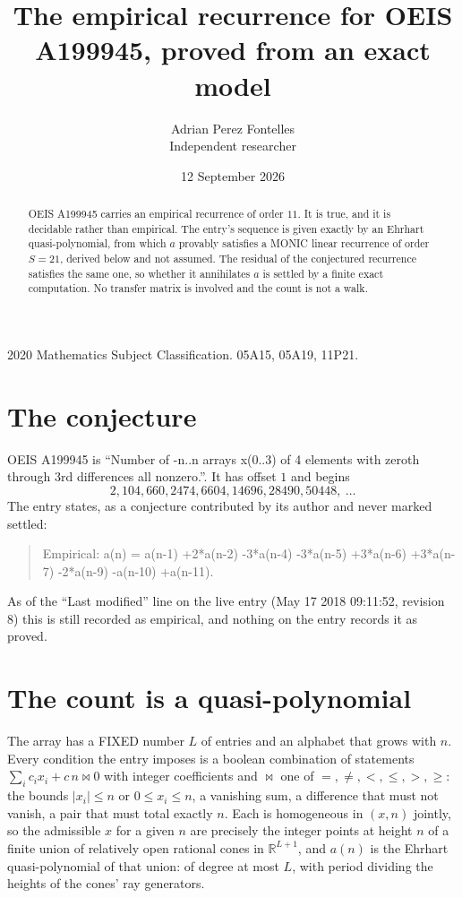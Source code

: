 \documentclass[11pt,a4paper]{article}
\title{The empirical recurrence for OEIS A199945, proved from an exact model}
\author{Adrian Perez Fontelles\\ \small Independent researcher}
\date{12 September 2026}
\theoremstyle{plain}
\theoremstyle{definition}
\begin{document}
\maketitle

\begin{abstract}
OEIS A199945 carries an empirical recurrence of order $11$. It is true, and it is
decidable rather than empirical. The entry's sequence is given exactly by an Ehrhart quasi-polynomial, from
which $a$ provably satisfies a MONIC linear recurrence of order $S=21$, derived below and not
assumed. The residual of the conjectured recurrence satisfies the same one, so whether it
annihilates $a$ is settled by a finite exact computation. No transfer matrix is involved and
the count is not a walk.
\end{abstract}

\noindent\small 2020 Mathematics Subject Classification. 05A15, 05A19, 11P21.\normalsize

\section{The conjecture}

OEIS A199945 is ``Number of -n..n arrays x(0..3) of 4 elements with zeroth through 3rd differences all nonzero.''. It has offset $1$ and begins
\[
2, 104, 660, 2474, 6604, 14696, 28490, 50448,\ \dots
\]
The entry states, as a conjecture contributed by its author and never marked settled:
\begin{quote}
Empirical: a(n) = a(n-1) +2*a(n-2) -3*a(n-4) -3*a(n-5) +3*a(n-6) +3*a(n-7) -2*a(n-9) -a(n-10) +a(n-11).
\end{quote}
As of the ``Last modified'' line on the live entry (May 17 2018 09:11:52, revision 8)
this is still recorded as empirical, and nothing on the entry records it as proved.

\section{The count is a quasi-polynomial}

The array has a FIXED number $L$ of entries and an alphabet that grows with $n$. Every
condition the entry imposes is a boolean combination of statements
$\sum_i c_ix_i + c\,n \bowtie 0$ with integer coefficients and $\bowtie$ one of
$=,\ne,<,\le,>,\ge$: the bounds $|x_i|\le n$ or $0\le x_i\le n$, a vanishing sum, a difference
that must not vanish, a pair that must total exactly $n$. Each is homogeneous in $(x,n)$
jointly, so the admissible $x$ for a given $n$ are precisely the integer points at height $n$
of a finite union of relatively open rational cones in $\mathbb{R}^{L+1}$, and $a(n)$ is
the Ehrhart quasi-polynomial of that union: of degree at most $L$, with period dividing the
heights of the cones' ray generators.
\end{document}
